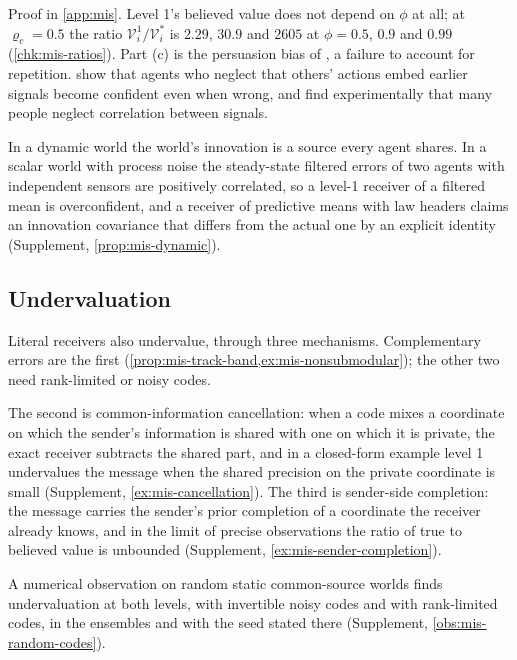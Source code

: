 Proof in \cref{app:mis}. Level 1's believed value does not depend on $\phi$ at all; at $\varrho_c=0.5$ the ratio $\mathcal V^1_i/\mathcal V^\ast_i$ is $2.29$, $30.9$ and $2605$ at $\phi=0.5$, $0.9$ and $0.99$ (\cref{chk:mis-ratios}). Part (c) is the persuasion bias of \citet{demarzo2003persuasion}, a failure to account for repetition. \citet{eyster2010naive} show that agents who neglect that others' actions embed earlier signals become confident even when wrong, and \citet{enke2019correlation} find experimentally that many people neglect correlation between signals.

In a dynamic world the world's innovation is a source every agent shares. In a scalar world with process noise the steady-state filtered errors of two agents with independent sensors are positively correlated, so a level-1 receiver of a filtered mean is overconfident, and a receiver of predictive means with law headers claims an innovation covariance that differs from the actual one by an explicit identity (Supplement, \cref{prop:mis-dynamic}).

\subsection{Undervaluation}\label{sec:mis-under}

Literal receivers also undervalue, through three mechanisms. Complementary errors are the first (\cref{prop:mis-track-band,ex:mis-nonsubmodular}); the other two need rank-limited or noisy codes.

The second is common-information cancellation: when a code mixes a coordinate on which the sender's information is shared with one on which it is private, the exact receiver subtracts the shared part, and in a closed-form example level 1 undervalues the message when the shared precision on the private coordinate is small (Supplement, \cref{ex:mis-cancellation}). The third is sender-side completion: the message carries the sender's prior completion of a coordinate the receiver already knows, and in the limit of precise observations the ratio of true to believed value is unbounded (Supplement, \cref{ex:mis-sender-completion}).

A numerical observation on random static common-source worlds finds undervaluation at both levels, with invertible noisy codes and with rank-limited codes, in the ensembles and with the seed stated there (Supplement, \cref{obs:mis-random-codes}).

